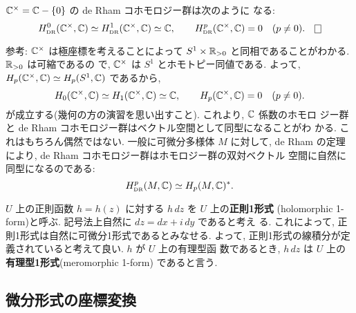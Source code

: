 \documentclass[12pt,twoside]{jarticle}
\def\setminus{-}
\def\Hdr{H_{\text{\rm DR}}}
\def\Hdr{H_{\text{\tiny DR}}}
\def\R{{\Bbb R}} %
\def\C{{\Bbb C}} %
\begin{document}
\begin{question}
  $\C^{\times}=\C\setminus\{0\}$ の de Rham コホモロジー群は次のように
  なる:
  \[
    \Hdr^0(\C^{\times},\C)\simeq\Hdr^1(\C^{\times},\C)\simeq\C,
    \qquad
    \Hdr^p(\C^{\times},\C)=0 \quad(p\ne0). \qed
  \]
\end{question}

\noindent 参考: $\C^{\times}$ は極座標を考えることによって %
$S^1\times\R_{>0}$ と同相であることがわかる. $\R_{>0}$ は可縮であるの
で, $\C^{\times}$ は $S^1$ とホモトピー同値である. よって, %
$H_p(\C^{\times},\C)\simeq H_p(S^1,\C)$ であるから, 
\[
  H_0(\C^{\times},\C)\simeq H_1(\C^{\times},\C)\simeq \C,
  \qquad
  H_p(\C^{\times},\C)=0 \quad (p\ne 0).
\] %
が成立する(幾何の方の演習を思い出すこと). これより, $\C$ 係数のホモロ
ジー群と de Rham コホモロジー群はベクトル空間として同型になることがわ
かる. これはもちろん偶然ではない. 一般に可微分多様体 $M$ に対して, de
Rham の定理により, de Rham コホモロジー群はホモロジー群の双対ベクトル
空間に自然に同型になるのである:
\[
  \Hdr^p(M,\C) \simeq H_p(M,\C)^*.
\]

\bigskip

$U$ 上の正則函数 $h=h(z)$ に対する $h\,dz$ を $U$ 上の{\bf 正則1形式}
(holomorphic 1-form)と呼ぶ. 記号法上自然に $dz=dx+i\,dy$ であると考え
る. これによって, 正則1形式は自然に可微分1形式であるとみなせる. よって, 
正則1形式の線積分が定義されていると考えて良い. $h$ が $U$ 上の有理型函
数であるとき, $h\,dz$ は $U$ 上の{\bf 有理型1形式}(meromorphic 1-form)
であると言う.


\subsection{微分形式の座標変換}
\end{document}
